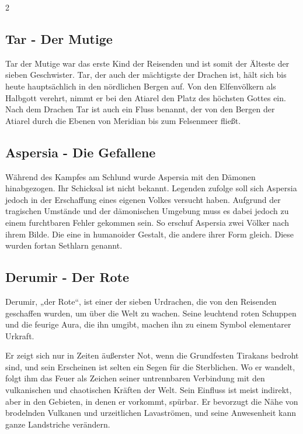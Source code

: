 \begin{multicols}{2}
{\subsection{Tar - Der Mutige}\label{subsec:tar-der-mutige}

Tar der Mutige war das erste Kind der Reisenden und ist somit der Älteste der sieben Geschwister.
Tar, der auch der mächtigste der Drachen ist, hält sich bis heute hauptsächlich in den nördlichen Bergen auf.
Von den Elfenvölkern als Halbgott verehrt, nimmt er bei den Atiarel den Platz des höchsten Gottes ein.
Nach dem Drachen Tar ist auch ein Fluss benannt, der von den Bergen der Atiarel durch die Ebenen von Meridian bis zum Felsenmeer fließt.

\subsection{Aspersia - Die Gefallene}\label{subsec:aspersia-die-gefallene}

Während des Kampfes am Schlund wurde Aspersia mit den Dämonen hinabgezogen.
Ihr Schicksal ist nicht bekannt.
Legenden zufolge soll sich Aspersia jedoch in der Erschaffung eines eigenen Volkes versucht haben.
Aufgrund der tragischen Umstände und der dämonischen Umgebung muss es dabei jedoch zu einem furchtbaren Fehler gekommen sein.
So erschuf Aspersia zwei Völker nach ihrem Bilde.
Die eine in humanoider Gestalt, die andere ihrer Form gleich.
Diese wurden fortan Sethlarn genannt.

\subsection{Derumir - Der Rote}\label{subsec:derumir---der-rote}

Derumir, „der Rote“, ist einer der sieben Urdrachen, die von den Reisenden geschaffen wurden, um über die Welt zu wachen.
Seine leuchtend roten Schuppen und die feurige Aura, die ihn umgibt, machen ihn zu einem Symbol elementarer Urkraft.

Er zeigt sich nur in Zeiten äußerster Not, wenn die Grundfesten Tirakans bedroht sind, und sein Erscheinen ist selten ein Segen für die Sterblichen.
Wo er wandelt, folgt ihm das Feuer als Zeichen seiner untrennbaren Verbindung mit den vulkanischen und chaotischen Kräften der Welt.
Sein Einfluss ist meist indirekt, aber in den Gebieten, in denen er vorkommt, spürbar.
Er bevorzugt die Nähe von brodelnden Vulkanen und urzeitlichen Lavaströmen, und seine Anwesenheit kann ganze Landstriche verändern.

}
\end{multicols}
